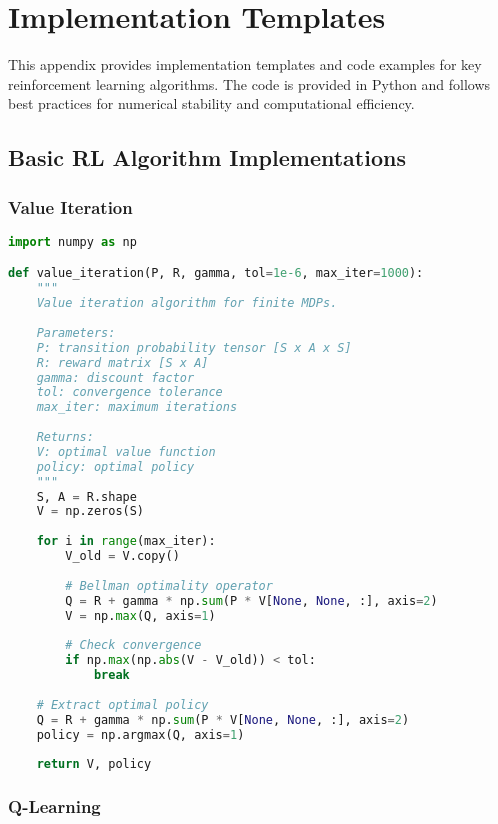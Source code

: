 \chapter{Implementation Templates}
\label{app:implementation}

This appendix provides implementation templates and code examples for key reinforcement learning algorithms. The code is provided in Python and follows best practices for numerical stability and computational efficiency.

\section{Basic RL Algorithm Implementations}

\subsection{Value Iteration}

\begin{lstlisting}[language=Python, caption=Value Iteration Implementation]
import numpy as np

def value_iteration(P, R, gamma, tol=1e-6, max_iter=1000):
    """
    Value iteration algorithm for finite MDPs.
    
    Parameters:
    P: transition probability tensor [S x A x S]
    R: reward matrix [S x A]
    gamma: discount factor
    tol: convergence tolerance
    max_iter: maximum iterations
    
    Returns:
    V: optimal value function
    policy: optimal policy
    """
    S, A = R.shape
    V = np.zeros(S)
    
    for i in range(max_iter):
        V_old = V.copy()
        
        # Bellman optimality operator
        Q = R + gamma * np.sum(P * V[None, None, :], axis=2)
        V = np.max(Q, axis=1)
        
        # Check convergence
        if np.max(np.abs(V - V_old)) < tol:
            break
    
    # Extract optimal policy
    Q = R + gamma * np.sum(P * V[None, None, :], axis=2)
    policy = np.argmax(Q, axis=1)
    
    return V, policy
\end{lstlisting}

\subsection{Q-Learning}

